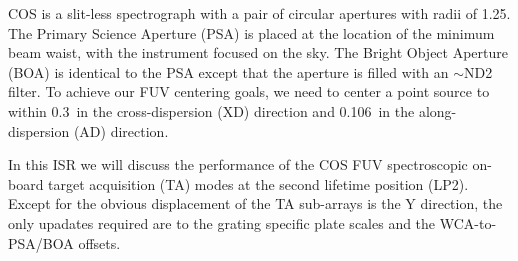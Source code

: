 COS is a slit-less spectrograph with a pair of circular apertures with radii of 1.25\arcsec. The Primary Science Aperture (PSA) is
placed at the location of the minimum beam waist, with the instrument focused on the sky. The Bright Object Aperture (BOA) is
identical to the PSA except that the aperture is filled with an $\sim$ND2 filter.
To achieve our FUV centering goals, we need to center a point source to within 0.3\arcsec\ in the cross-dispersion (XD) direction and 0.106\arcsec\ in the along-dispersion (AD) direction.

In this ISR we will discuss the performance of the COS FUV spectroscopic on-board target acquisition (TA) modes at the second lifetime position (LP2). Except for the obvious displacement of the TA sub-arrays is the Y direction, the only upadates required are to the grating specific plate scales and the WCA-to-PSA/BOA offsets.
